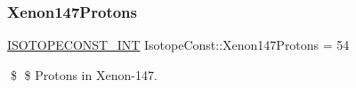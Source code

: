 \subsubsection{\texorpdfstring{Xenon147\+Protons}{Xenon147Protons}}
{\footnotesize\ttfamily \mbox{\hyperlink{group___isotope_const-_macros_ga5f18360b3e99483a35c32d789e62621c}{I\+S\+O\+T\+O\+P\+E\+C\+O\+N\+S\+T\+\_\+\+I\+NT}} Isotope\+Const\+::\+Xenon147\+Protons = 54}

\$ \$ Protons in Xenon-\/147. 